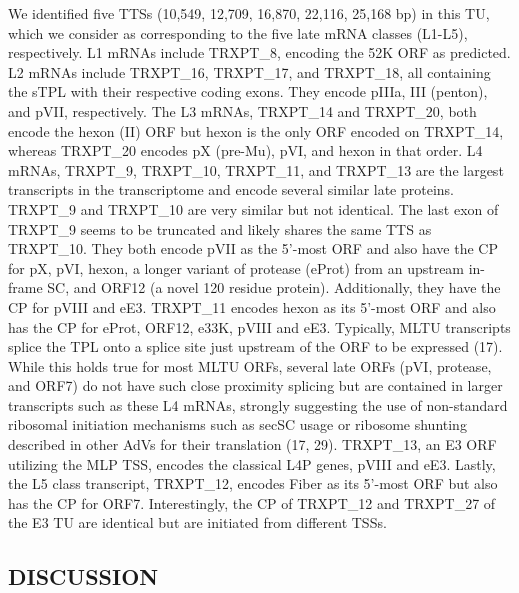 \documentclass[
]{article}
\begin{document}
We identified five TTSs (10,549, 12,709, 16,870, 22,116, 25,168 bp) in
this TU, which we consider as corresponding to the five late mRNA
classes (L1-L5), respectively. L1 mRNAs include TRXPT\_8, encoding the
52K ORF as predicted. L2 mRNAs include TRXPT\_16, TRXPT\_17, and
TRXPT\_18, all containing the sTPL with their respective coding exons.
They encode pIIIa, III (penton), and pVII, respectively. The L3 mRNAs,
TRXPT\_14 and TRXPT\_20, both encode the hexon (II) ORF but hexon is the
only ORF encoded on TRXPT\_14, whereas TRXPT\_20 encodes pX (pre-Mu),
pVI, and hexon in that order. L4 mRNAs, TRXPT\_9, TRXPT\_10, TRXPT\_11,
and TRXPT\_13 are the largest transcripts in the transcriptome and
encode several similar late proteins. TRXPT\_9 and TRXPT\_10 are very
similar but not identical. The last exon of TRXPT\_9 seems to be
truncated and likely shares the same TTS as TRXPT\_10. They both encode
pVII as the 5'-most ORF and also have the CP for pX, pVI, hexon, a
longer variant of protease (eProt) from an upstream in-frame SC, and
ORF12 (a novel 120 residue protein). Additionally, they have the CP for
pVIII and eE3. TRXPT\_11 encodes hexon as its 5'-most ORF and also has
the CP for eProt, ORF12, e33K, pVIII and eE3. Typically, MLTU
transcripts splice the TPL onto a splice site just upstream of the ORF
to be expressed (17). While this holds true for most MLTU ORFs, several
late ORFs (pVI, protease, and ORF7) do not have such close proximity
splicing but are contained in larger transcripts such as these L4 mRNAs,
strongly suggesting the use of non-standard ribosomal initiation
mechanisms such as secSC usage or ribosome shunting described in other
AdVs for their translation (17, 29). TRXPT\_13, an E3 ORF utilizing the
MLP TSS, encodes the classical L4P genes, pVIII and eE3. Lastly, the L5
class transcript, TRXPT\_12, encodes Fiber as its 5'-most ORF but also
has the CP for ORF7. Interestingly, the CP of TRXPT\_12 and TRXPT\_27 of
the E3 TU are identical but are initiated from different TSSs. \newpage

\subsection{DISCUSSION}\label{discussion}
\end{document}
